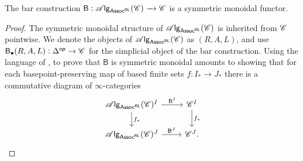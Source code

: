 \documentclass[../text]{subfiles}
\begin{document}
\begin{lemma}\label{lem:B_sym_mon}
    The bar construction $\mathsf{B}: \mathscr{A} \mathsf{lg}_{\mathsf{Assoc^{RL}}} (\mathscr{C}) \xrightarrow{\ \ } \mathscr{C}$ is a symmetric monoidal functor.
\end{lemma}

\begin{proof}
    The symmetric monoidal structure of $\mathscr{A} \mathsf{lg}_{\mathsf{Assoc^{RL}}} (\mathscr{C})$ is inherited from $\mathscr{C}$ pointwise. We denote the objects of $\mathscr{A} \mathsf{lg}_{\mathsf{Assoc^{RL}}} (\mathscr{C})$ as $(R,A,L)$, and use $\mathsf{B}_{\bullet} (R, A, L):\Delta^{\mathsf{op}} \rightarrow \mathscr{C}$ for the simplicial object of the bar construction. Using the language of \cite[def.2.1.2.7]{lurie_ha}, to prove that $\mathsf{B}$ is symmetric monoidal amounts to showing that for each basepoint-preserving map of based finite sets $f: I_* \xrightarrow{} J_*$ there is a commutative diagram of $\infty$-categories
    \begin{equation}
        \begin{tikzcd}
            \alg{\mathsf{Assoc^{RL}}} (\catC)^I \arrow[r, "\mathsf{B}^I"] \arrow[d, "f_*"] & \catC^I \arrow[d, "f_*"] \\
            \alg{\mathsf{Assoc^{RL}}} (\catC)^J \arrow[r, "\mathsf{B}^J"] & \catC^J.
        \end{tikzcd}
    \end{equation}
    

\end{proof}
\end{document}
